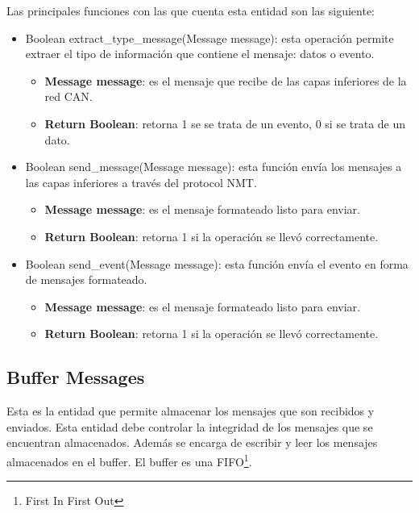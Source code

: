 Las principales funciones con las que cuenta esta entidad son las siguiente:
\begin{itemize}
  \item Boolean extract\_type\_message(Message message): esta operación permite
  extraer el tipo de información que contiene el mensaje: datos o evento.
  \begin{itemize}
  \item \textbf{Message message}: es el mensaje que recibe de las capas inferiores
    de la red CAN.
  \item \textbf{Return Boolean}: retorna 1 se se trata de un evento, 0 si se
    trata de un dato.
  \end{itemize}

\item Boolean send\_message(Message message): esta función envía los mensajes
  a las capas inferiores a través del protocol NMT.
  \begin{itemize}
  \item \textbf{Message message}: es el mensaje formateado listo para enviar.
  \item \textbf{Return Boolean}: retorna 1 si la operación se llevó
    correctamente.
  \end{itemize}
\item Boolean send\_event(Message message): esta función envía el evento en
  forma de mensajes formateado. 
    \begin{itemize}
  \item \textbf{Message message}: es el mensaje formateado listo para enviar.
  \item \textbf{Return Boolean}: retorna 1 si la operación se llevó
    correctamente.
  \end{itemize}
\end{itemize}

\subsection{Buffer Messages}
Esta es la entidad que permite almacenar los mensajes que son recibidos y
enviados. Esta entidad debe controlar la integridad de los mensajes que se
encuentran almacenados. Además se encarga de escribir y leer los mensajes
almacenados en el buffer. El buffer es una  FIFO\footnote{First In First Out}.


